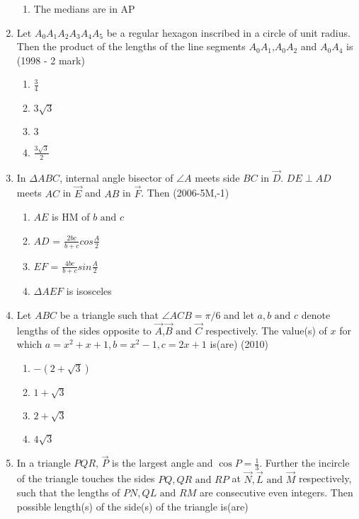 \documentclass[journal,12pt,twocolumn]{IEEEtran}
\theoremstyle{remark}
\begin{document}
\begin{enumerate}
\begin{enumerate}
    \item The medians are in AP
    \end{enumerate}
    \item Let $A_{0}A_{1}A_{2}A_{3}A_{4}A_{5}$ be a regular hexagon inscribed in a circle of unit radius. Then the product of the lengths of the line segments $A_{0}A_{1}$,$A_{0}A_{2}$ and $A_{0}A_{4}$ is 
    \hfill{(1998 - 2 mark)}
    \begin{multicols}{2}
    \begin{enumerate}
    \item ${\frac{3}{4}}$
    \item $3\sqrt{3}$
    \item $3$
    \item ${\frac{3\sqrt{3}}{2}}$
    \end{enumerate}
    \end{multicols}
    \item In $\Delta ABC$, internal angle bisector of $\angle A$ meets side $BC$ in $\vec{D}$. $DE \perp AD$ meets $AC$ in $\vec{E}$ and $AB$ in $\vec{F}$. Then
    \hfill{(2006-5M,-1)}
    \begin{enumerate}
    \item $AE$ is HM of $b \text{ and } c$
    \item $AD$ = ${\frac{2bc}{b+c}}cos{\frac{A}{2}}$
    \item $EF$ = ${\frac{4bc}{b+c}}sin{\frac{A}{2}}$
    \item $\Delta AEF$ is isosceles
    \end{enumerate}
    \item Let $ABC$ be a triangle such that $\angle ACB = \pi/6$ and let $a,b \text{ and } c$ denote lengths of the sides opposite to $\vec{A}$,$\vec{B} \text{ and } \vec{C}$ respectively. The value(s) of $x$ for which $a = x^{2}+x+1, b = x^{2}-1, c = 2x+1$ is(are)
    \hfill{(2010)}
    \begin{multicols}{2}
    \begin{enumerate}
    \item $-(2+\sqrt{3})$
    \item $1+\sqrt{3}$
    \item $2+\sqrt{3}$
    \item $4\sqrt{3}$
    \end{enumerate}
    \end{multicols}
    \item In a triangle $PQR$, $\vec{P}$ is the largest angle and $\cos{P} = \frac{1}{3}$. Further the incircle of the triangle touches the sides $PQ,QR \text{ and } RP$ at $\vec{N},\vec{L} \text{ and } \vec{M}$ respectively, such that the lengths of $PN, QL \text{ and } RM$ are consecutive even integers. Then possible length(s) of the side(s) of the triangle is(are)

\end{enumerate}
\end{document}
